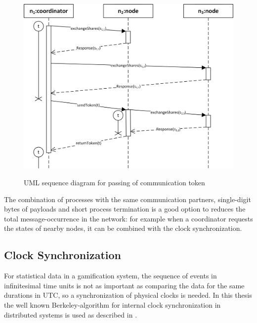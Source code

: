 		\begin{figure}[!htb] %
		\caption{\gls{UML} sequence diagram for passing of communication token}
		\includegraphics[scale=1.0]{figures/token-passing.png}
		\label{figure:coordinator token passing}
		\end{figure}
	
		
	
	
		The combination of processes with the same communication partners, single-digit bytes of payloads and short process termination is a good option to reduces the total message-occurrence in the network: for example when a coordinator requests the states of nearby nodes, it can be combined with the clock synchronization.
		
		\subsection{Clock Synchronization}
		\label{Clock synchronization}
		
		For statistical data in a gamification system, the sequence of events in infinitesimal time units is not as important as comparing the data for the same durations in \gls{UTC}, so a synchronization of physical clocks is needed. In this thesis  the well known Berkeley-algorithm for internal clock synchronization in distributed systems is used as described in \textcite{Ghosh2015}.
		
